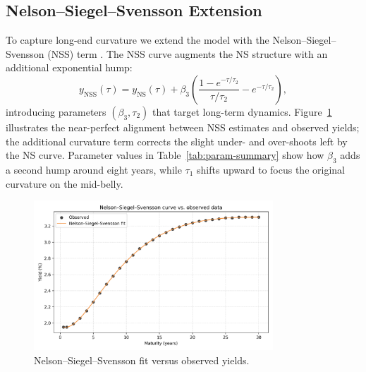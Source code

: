 \documentclass[12pt]{article}
\begin{document}
\subsection{Nelson--Siegel--Svensson Extension}
\begin{spacing}{1.15}
To capture long-end curvature we extend the model with the Nelson--Siegel--Svensson (NSS) term \parencite{diebold_li_2006, ecb_yield_curve_2018}. The NSS curve augments the NS structure with an additional exponential hump:
\begin{equation}
  y_{\text{NSS}}(\tau) = y_{\text{NS}}(\tau) + \beta_3 \left( \frac{1 - e^{-\tau/\tau_2}}{\tau/\tau_2} - e^{-\tau/\tau_2} \right),
\end{equation}
introducing parameters $(\beta_3, \tau_2)$ that target long-term dynamics. Figure~\ref{fig:nss-fit} illustrates the near-perfect alignment between NSS estimates and observed yields; the additional curvature term corrects the slight under- and over-shoots left by the NS curve. Parameter values in Table~\ref{tab:param-summary} show how $\beta_3$ adds a second hump around eight years, while $\tau_1$ shifts upward to focus the original curvature on the mid-belly.
\end{spacing}

\begin{figure}[htbp]
  \centering
  \includegraphics[width=0.8\textwidth]{../data/output/figure_nss_fit.png}
  \caption{Nelson--Siegel--Svensson fit versus observed yields.}
  \label{fig:nss-fit}
\end{figure}

\FloatBarrier
\end{document}

